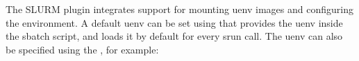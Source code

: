 The SLURM plugin integrates support for mounting uenv images and configuring the environment.
A default uenv can be set using  that provides the uenv inside the sbatch script, and loads it by default for every srun call.
The uenv can also be specified using the , for example:


